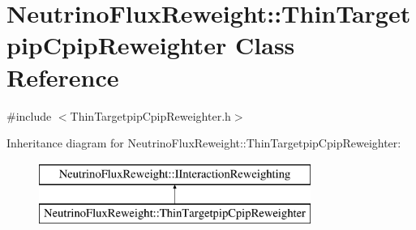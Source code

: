 \hypertarget{class_neutrino_flux_reweight_1_1_thin_targetpip_cpip_reweighter}{\section{Neutrino\-Flux\-Reweight\-:\-:Thin\-Targetpip\-Cpip\-Reweighter Class Reference}
\label{class_neutrino_flux_reweight_1_1_thin_targetpip_cpip_reweighter}
}


{\ttfamily \#include $<$Thin\-Targetpip\-Cpip\-Reweighter.\-h$>$}

Inheritance diagram for Neutrino\-Flux\-Reweight\-:\-:Thin\-Targetpip\-Cpip\-Reweighter\-:\begin{figure}[H]
\begin{center}
\leavevmode
\includegraphics[height=2.000000cm]{class_neutrino_flux_reweight_1_1_thin_targetpip_cpip_reweighter}
\end{center}
\end{figure}
